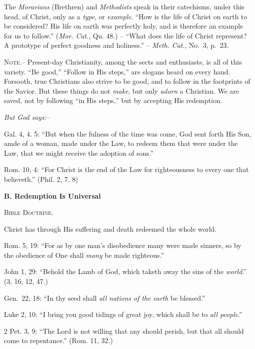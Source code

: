 \documentclass[
]{book}
\begin{document}
The \emph{Moravians} (Brethren) and \emph{Methodists} speak in their catechisms, under this head, of Christ, only as a \emph{type}, or \emph{example}. ``How is the life of Christ on earth to be considered? His life on earth was perfectly holy, and is therefore an example for us to follow.'' (\emph{Mor. Cat.}, Qu. 48.) -- ``What does the life of Christ represent? A prototype of perfect goodness and holiness.'' -- \emph{Meth. Cat.}, No.~3, p.~23.

\textsc{Note.--} Present-day Christianity, among the sects and enthusiasts, is all of this variety. ``Be good,'' ``Follow in His steps,'' are slogans heard on every hand. Forsooth, true Christians also strive to be good, and to follow in the footprints of the Savior. But these things do not \emph{make}, but only \emph{adorn} a Christian. We are saved, not by following ``in His steps,'' but by accepting His redemption.

\begin{center}
\textsl{But God says:--}
\end{center}

Gal. 4, 4. 5: ``But when the fulness of the time was come, God sent forth His Son, amde of a woman, made under the Law, to redeem them that were under the Law, that we might receive the adoption of sons.''

Rom. 10, 4: ``For Christ is the end of the Law for righteousness to every one that believeth.'' (Phil. 2, 7. 8)

\begin{center}
\textbf{B.  Redemption Is Universal}

\textsc{Bible Doctrine.}
\end{center}

Christ has through His suffering and death redeemed the whole world.

Rom. 5, 19: ``For as by one man's disobedience many were made sinners, so by the obedience of One shall \emph{many} be made righteous.''

John 1, 29: ``Behold the Lamb of God, which taketh away the sins of the \emph{world}.'' (3, 16; 12, 47.)

Gen.~22, 18: ``In thy seed shall \emph{all nations of the earth} be blessed.''

Luke 2, 10: ``I bring you good tidings of great joy, which shall be to \emph{all people}.''

2 Pet. 3, 9: ``The Lord is not willing that any should perish, but that all should come to repentance.'' (Rom. 11, 32.)
\end{document}
